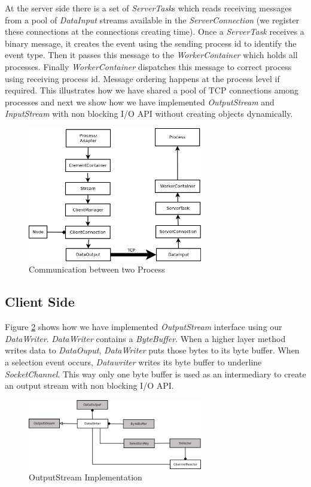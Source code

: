 At the server side there is a set of \textit{ServerTask}s which reads receiving messages from a pool of \textit{DataInput} streams available in the \textit{ServerConnection} (we register these connections at the connections creating time). Once a \textit{ServerTask} receives a binary message, it creates the event using the sending process id to identify the event type. Then it passes this message to the \textit{WorkerContainer} which holds all processes. Finally \textit{WorkerContainer} dispatches this message to correct process using receiving process id. Message ordering happens at the process level if required. This illustrates how we have shared a pool of TCP connections among processes and next we show how we have implemented \textit{OutputStream} and \textit{InputStream} with non blocking I/O API without  creating objects dynamically.
\begin{figure}[!tii]
        \centering
        \includegraphics[width=3.0in]{interprocess.png}
        \caption{Communication between two Process}
        \label{interprocess}
\end{figure}
\subsection{Client Side}
Figure \ref{client} shows how we have implemented \textit{OutputStream} interface using our \textit{DataWriter}. \textit{DataWriter} contains a \textit{ByteBuffer}. When a higher layer method writes data to \textit{DataOuput}, \textit{DataWriter} puts those bytes to its byte buffer. When a selection event occurs, \textit{Datawriter} writes its byte buffer to underline \textit{SocketChannel}. This way only one byte buffer is used as an intermediary to create an output stream with non blocking I/O API.
\begin{figure}[!t]
        \centering
        \includegraphics[width=3.0in]{client.png}
        \caption{OutputStream Implementation}
        \label{client}
\end{figure}
